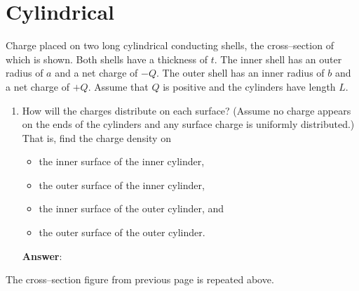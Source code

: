 \documentclass{article}
\begin{document}
\newpage

\section{Cylindrical}

Charge placed on two long cylindrical conducting shells, the cross--section of which is shown. Both shells have a thickness of $t$. The inner shell has an outer radius of $a$ and a net charge of $-Q$. The outer shell has an inner radius of $b$ and a net charge of $+Q$. Assume that $Q$ is positive and the cylinders have length $L$.





\begin{enumerate}

  \item How will the charges distribute on each surface? (Assume no charge appears on the ends of the cylinders and any surface charge is uniformly distributed.) That is, find the charge density on

    \begin{itemize}

      \item the inner surface of the inner cylinder,

      \item the outer surface of the inner cylinder,

      \item the inner surface of the outer cylinder, and

      \item the outer surface of the outer cylinder.

    \end{itemize}

        \ifsolutions
        \textbf{Answer}:
        \fi

\end{enumerate}

\newpage



The cross--section figure from previous page is repeated above.
\end{document}
